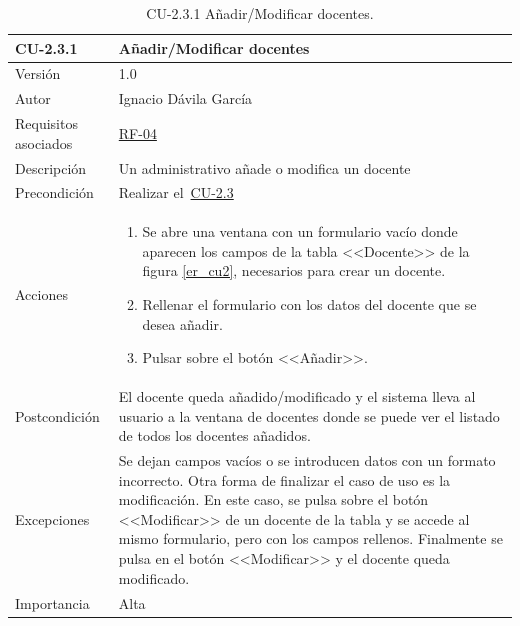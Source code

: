 \begin{table}[p]
	\centering
	\begin{tabularx}{\linewidth}{ p{} p{} }
		\toprule
		\textbf{CU-2.3.1}    & \textbf{Añadir/Modificar docentes}\\
		\toprule
		{\small Versión}              & 1.0    \\
		{\small Autor}                & Ignacio Dávila García \\
		{\small Requisitos asociados} & \hyperref[itm:RF4]{RF-04} \\
		{\small Descripción}          & Un administrativo añade o modifica un docente \\
		{\small Precondición}         & Realizar el~\hyperref[table:CU-2_3]{CU-2.3} \\
		{\small Acciones}             &
		\begin{enumerate}
			\def\labelenumi{\arabic{enumi}.}
			\tightlist
			\item Se abre una ventana con un formulario vacío donde aparecen los campos de la tabla <<Docente>> de la figura \ref{er_cu2}, necesarios para crear un docente.
			\item Rellenar el formulario con los datos del docente que se desea añadir.
			\item Pulsar sobre el botón <<Añadir>>.
		\end{enumerate}\\
		{\small Postcondición}        & El docente queda añadido/modificado y el sistema lleva al usuario a la ventana de docentes donde se puede ver el listado de todos los docentes añadidos. \\
		{\small Excepciones}          & Se dejan campos vacíos o se introducen datos con un formato incorrecto. Otra forma de finalizar el caso de uso es la modificación. En este caso, se pulsa sobre el botón <<Modificar>> de un docente de la tabla y se accede al mismo formulario, pero con los campos rellenos. Finalmente se pulsa en el botón <<Modificar>> y el docente queda modificado. \\
		{\small Importancia}          & Alta \\
		\bottomrule
	\end{tabularx}
	\caption{CU-2.3.1 Añadir/Modificar docentes.}\label{table:CU-2_3_1}
\end{table}
\FloatBarrier

